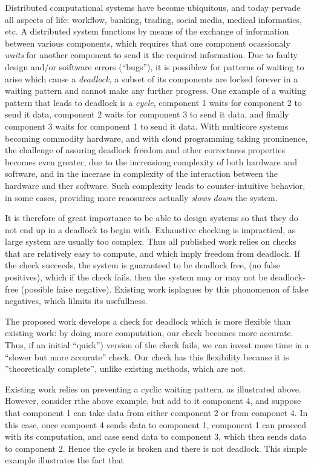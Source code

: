 Distributed computational systems have become ubiquitous, and today pervade all aspects of life: workflow, banking, trading, 
social media, medical informatics, etc.
%
A distributed system functions by means of the exchange of information between various components, which requires 
that one component ocassionaly \emph{waits} for another component to send it the required information. 
Due to faulty design and/or soiftware errors (``bugs''), it is possiblew for patterns of waiting to arise which cause a 
{\em deadlock}, \ie a subset of its components are locked forever in a waiting pattern and cannot make any further progress.
%
One example of a waiting pattern that leads to deadlock is a \emph{cycle}, \eg component 1 waits for component 2 to send it data, 
component 2 waits for component 3 to send it data, and finally 
component 3 waits for component 1 to send it data.
%
%
With multicore systems becoming commodity hardware, and with cloud programming taking prominence, the challenge
of assuring deadlock freedom and other correctness properties becomes even greater,  due to the increasiong complexity of both hardware and software,
and in the incerase in complexity of the interaction between the hardware and ther software. Such complexity leads to counter-intuitive behavior, \eg
in some cases, providing more reaosurces actually \emph{slows down} the system.

It is therefore of great importance to be able to design systems so that they do not end up in a deadlock to begin with. 
Exhaustive checking is impractical, as large system are usually too complex. Thus all published work relies on checks that are 
relatively easy to compute, and which imply freedom from deadlock. If the check succeeds, the system is guaranteed to be deadlock free, (no false
positives), which if the check fails, then the system may or may not be deadlock-free (possible faise negative).  Existing work isplagues by this
phonomenon of false negatives, which lilmits its usefullness.

The proposed work develops a check for deadlock which is more flexible than existing work: by doing more computation, our check becomes more 
accurate. Thus, if an initial ``quick'') version of the check fails, we can invest more time in a ``slower but more accurate'' check. 
Our check has this flexibility because it is ''theoretically complete'', unlike existing methods, which are not.


Existing work relies on preventing a cyclic waiting pattern, as illustrated above. However, consider rthe above example, but add to it component 4,
and suppose that component 1 can take data from either component 2 or from componet 4. In this case, once compoent 4 sends data to component 1,
component 1 can proceed with its computation, and case send data to component 3, which then sends data to component 2. Hence the cycle is broken and
there is not deadlock.
%
This simple example illustrates the fact that 



%
